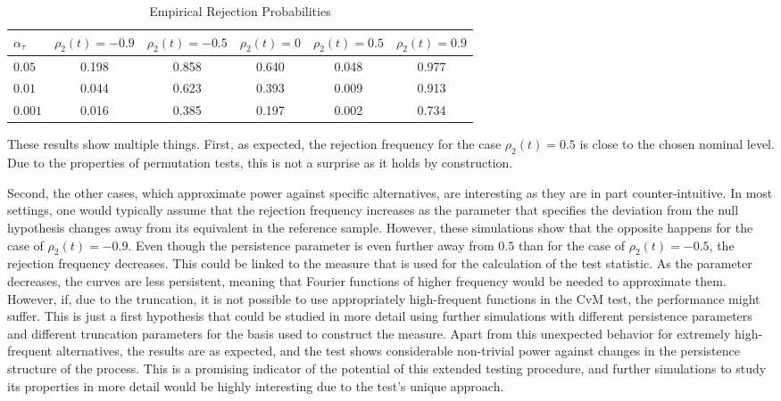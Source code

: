 \documentclass[12pt, a4paper]{article}
\theoremstyle{MAstyle} \newtheorem{assumption}{Assumption}[section]
\theoremstyle{MAstyle} \newtheorem{definition}{Definition}[section]
\theoremstyle{MAstyle} \newtheorem{theorem}{Theorem}[section]
\begin{document}
		\begin{table}[H]
			\centering
			\begin{tabular}{l|ccccc}\toprule
				$\alpha_{\tau}$ &$\rho_2(t) = -0.9$ &$\rho_2(t) = -0.5$ &$\rho_2(t) = 0$ &$\rho_2(t) = 0.5$ &$\rho_2(t) = 0.9$\\
				\midrule
				$0.05$	& 0.198 & 0.858  &  0.640 & 0.048   & 0.977  \\
				$0.01$ 	& 0.044	& 0.623  &  0.393 & 0.009   & 0.913  \\
				$0.001$	& 0.016	& 0.385  &  0.197 & 0.002   & 0.734  \\
				\bottomrule
			\end{tabular}
			\caption{Empirical Rejection Probabilities}
			\label{rej_probs_cor}
		\end{table}
		These results show multiple things. First, as expected, the rejection frequency for the case $\rho_2(t) = 0.5$ is close to the chosen nominal level. Due to the properties of permutation tests, this is not a surprise as it holds by construction. 
		
		Second, the other cases, which approximate power against specific alternatives, are interesting as they are in part counter-intuitive.		
		In most settings, one would typically assume that the rejection frequency increases as the parameter that specifies the deviation from the null hypothesis changes away from its equivalent in the reference sample. However, these simulations show that the opposite happens for the case of $\rho_2(t) = -0.9$. Even though the persistence parameter is even further away from $0.5$ than for the case of $\rho_2(t) = -0.5$, the rejection frequency decreases. This could be linked to the measure that is used for the calculation of the test statistic. As the parameter decreases, the curves are less persistent, meaning that Fourier functions of higher frequency would be needed to approximate them. However, if, due to the truncation, it is not possible to use appropriately high-frequent functions in the CvM test, the performance might suffer. This is just a first hypothesis that could be studied in more detail using further simulations with different persistence parameters and different truncation parameters for the basis used to construct the measure.
		Apart from this unexpected behavior for extremely high-frequent alternatives, the results are as expected, and the test shows considerable non-trivial power against changes in the persistence structure of the process. This is a promising indicator of the potential of this extended testing procedure, and further simulations to study its properties in more detail would be highly interesting due to the test's unique approach.
				
\end{document}
